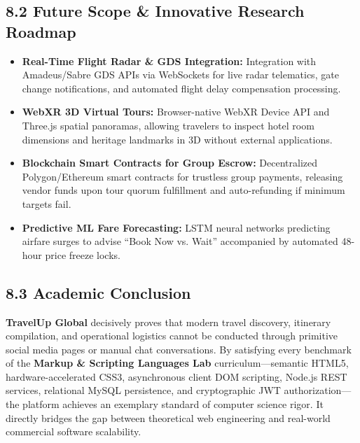 \documentclass[11pt,a4paper]{article}
\begin{document}
\subsection{8.2 Future Scope \& Innovative Research Roadmap}
\begin{itemize}[leftmargin=*]
    \item \textbf{Real-Time Flight Radar \& GDS Integration:} Integration with Amadeus/Sabre GDS APIs via WebSockets for live radar telematics, gate change notifications, and automated flight delay compensation processing.
    \item \textbf{WebXR 3D Virtual Tours:} Browser-native WebXR Device API and Three.js spatial panoramas, allowing travelers to inspect hotel room dimensions and heritage landmarks in 3D without external applications.
    \item \textbf{Blockchain Smart Contracts for Group Escrow:} Decentralized Polygon/Ethereum smart contracts for trustless group payments, releasing vendor funds upon tour quorum fulfillment and auto-refunding if minimum targets fail.
    \item \textbf{Predictive ML Fare Forecasting:} LSTM neural networks predicting airfare surges to advise ``Book Now vs. Wait'' accompanied by automated 48-hour price freeze locks.
\end{itemize}

\subsection{8.3 Academic Conclusion}
\textbf{TravelUp Global} decisively proves that modern travel discovery, itinerary compilation, and operational logistics cannot be conducted through primitive social media pages or manual chat conversations. By satisfying every benchmark of the \textbf{Markup \& Scripting Languages Lab} curriculum---semantic HTML5, hardware-accelerated CSS3, asynchronous client DOM scripting, Node.js REST services, relational MySQL persistence, and cryptographic JWT authorization---the platform achieves an exemplary standard of computer science rigor. It directly bridges the gap between theoretical web engineering and real-world commercial software scalability.
\end{document}
